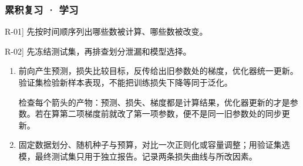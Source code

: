 \subsubsection*{累积复习 · 学习}
\begin{answerhints}
\item[\hyperref[exercise:review-learning-cycle]{R-01}] \leavevmode{}\label{hint:review-learning-cycle}先按时间顺序列出哪些数被计算、哪些数被改变。
\item[\hyperref[exercise:review-validation-experiment]{R-02}] \leavevmode{}\label{hint:review-validation-experiment}先冻结测试集，再排查划分泄漏和模型选择。
\end{answerhints}
\begin{enumerate}[label={},leftmargin=4.8em,itemsep=4pt]
\item[\textbf{\hyperref[exercise:review-learning-cycle]{R-01.}}] \leavevmode{}\label{solution:R-01}\label{solution:review-learning-cycle}前向产生预测，损失比较目标，反传给出旧参数处的梯度，优化器统一更新。验证集检验新样本表现，不能把训练损失下降等同于泛化。\par 检查每个箭头的产物：预测、损失、梯度都是计算结果，优化器更新的才是参数。若在算第二项梯度前就改了第一项参数，便不是同一旧参数处的同步更新。
\item[\textbf{\hyperref[exercise:review-validation-experiment]{R-02.}}] \leavevmode{}\label{solution:R-02}\label{solution:review-validation-experiment}固定数据划分、随机种子与预算，对比一次正则化或容量调整；用验证集选模，最终测试集只用于独立报告。记录两条损失曲线与所改因素。
\end{enumerate}
